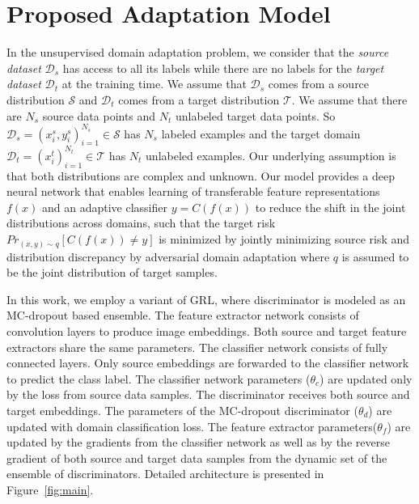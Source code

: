 \documentclass{bmvc2k}
\begin{document}
\section{Proposed Adaptation Model}
In the unsupervised domain adaptation problem, we consider that the \textit{source dataset} $\mathcal{D}_s$ has access to all its labels while there are no labels for the \textit{target dataset} $\mathcal{D}_t$ at the training time. We assume that $\mathcal{D}_s$ comes from a source distribution $ \mathcal{S}$ and $\mathcal{D}_t$ comes from a target distribution $ \mathcal{T}$. We assume that there are $N_s$ source data points and $N_t$ unlabeled target data points.
So $ \mathcal{D}_s = {(x_i^s,y_i^s)}_{i=1}^{N_s} \in   \mathcal{S}$ has $N_s$ labeled examples and the target
domain $\mathcal{D}_t = {(x_i^t)}_{i=1}^{N_t} \in  \mathcal{T} $  has $N_t$ unlabeled examples.
Our underlying assumption is that both distributions are complex and unknown.
Our model provides a deep neural network that enables learning of transferable feature representations $f(x)$ and an adaptive  classifier $y = C(f(x))$ to reduce the
shift in the joint distributions across domains, such that the
target risk $Pr_{(x,y)\sim q }[C(f(x))\neq y]$ is minimized by jointly
minimizing source risk and distribution discrepancy by adversarial 
domain adaptation where $q$  is assumed to be the joint distribution of target samples.

In this work, we employ a variant of GRL\cite{ganin_ICML2015}, where discriminator is modeled as an MC-dropout based ensemble. The feature extractor network consists of convolution layers to produce image embeddings. Both source and target feature extractors share the same parameters. The classifier network consists of fully connected layers. Only source embeddings are forwarded to the classifier network to predict the class label. The classifier network parameters ($\theta_c$) are updated only by the loss from source data samples. The discriminator receives both source and target embeddings. The parameters of the MC-dropout discriminator ($\theta_d$) are updated with domain classification loss. The feature extractor parameters($\theta_f$) are updated by the gradients from the classifier network as well as by the reverse gradient of both source and target data samples from the dynamic set of the ensemble of discriminators. Detailed architecture is presented in Figure~\ref{fig:main}.
\end{document}
